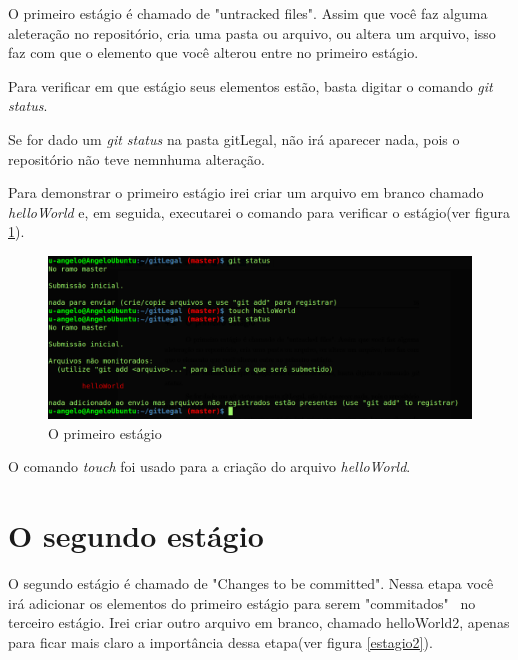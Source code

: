 \documentclass[12pt,openright,oneside,a4paper,english,brazil]{abntex2}
\begin{document}
O primeiro estágio é chamado de "untracked files". Assim que você faz alguma aleteração no repositório, cria uma pasta ou arquivo, ou altera um arquivo, isso faz com que o elemento que você alterou entre no primeiro estágio.

Para verificar em que estágio seus elementos estão, basta digitar o comando \textit{git status}.

Se for dado um \textit{git status} na pasta gitLegal, não irá aparecer nada, pois o repositório não teve nemnhuma alteração. 

Para demonstrar o primeiro estágio irei criar um arquivo em branco chamado \textit{helloWorld} e, em seguida, executarei o comando para verificar o estágio(ver figura \ref{estagio1}).

\begin{figure}[h]
	\caption{\label{estagio1}O primeiro estágio}
	\begin{center}
		\includegraphics[width=1\linewidth]{estagio1}
	\end{center}
\end{figure}

O comando \textit{touch} foi usado para a criação do arquivo \textit{helloWorld}.

\section{O segundo estágio}

O segundo estágio é chamado de "Changes to be committed". Nessa etapa você irá adicionar os elementos do primeiro estágio para serem "commitados" \ no terceiro estágio. Irei criar outro arquivo em branco, chamado helloWorld2, apenas para ficar mais claro a importância dessa etapa(ver figura \ref{estagio2}).
\end{document}
